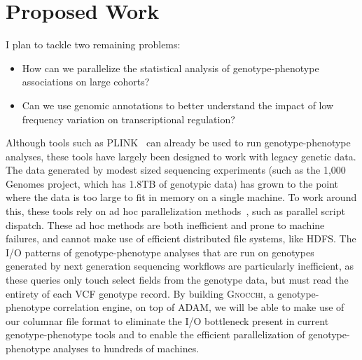\documentclass[11pt]{article} %
\begin{document}
\section{Proposed Work}

I plan to tackle two remaining problems:

\begin{itemize}
\item How can we parallelize the statistical analysis of genotype-phenotype associations on
large cohorts?
\item Can we use genomic annotations to better understand the impact of low frequency variation
on transcriptional regulation?
\end{itemize}

Although tools such as \textsc{PLINK}~\cite{purcell07, chang15} can already be used to run
genotype-phenotype analyses, these tools have largely been designed to work with legacy genetic
data. The data generated by modest sized sequencing experiments (such as the 1,000 Genomes project,
which has 1.8TB of genotypic data) has grown to the point where the data is too large to fit in
memory on a single machine. To work around this, these tools rely on ad hoc parallelization
methods~\cite{chang15}, such as parallel script dispatch. These ad hoc methods are both
inefficient and prone to machine failures, and cannot make use of efficient distributed file
systems, like \textsc{HDFS}. The I/O patterns of genotype-phenotype analyses that are run on
genotypes generated by next generation sequencing workflows are particularly inefficient, as
these queries only touch select fields from the genotype data, but must read the entirety of each
VCF genotype record. By building \textsc{Gnocchi}, a genotype-phenotype correlation engine, on top
of \textsc{ADAM}, we will be able to make use of our columnar file format to eliminate the I/O
bottleneck present in current genotype-phenotype tools and to enable the efficient parallelization
of genotype-phenotype analyses to hundreds of machines.
\end{document}
